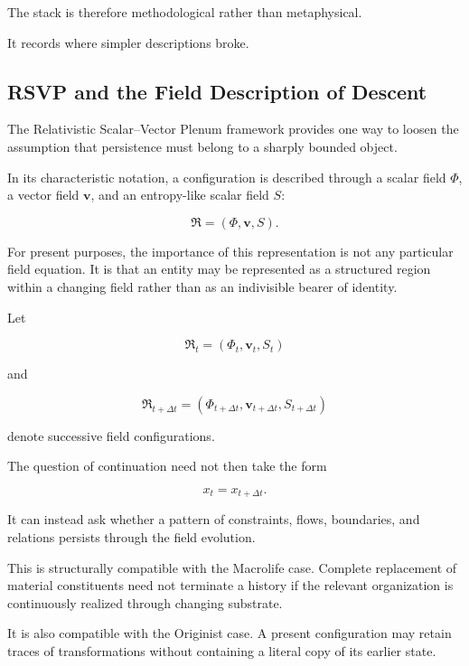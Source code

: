 \documentclass[
  11pt,
  a4paper,
  DIV=12,
  BCOR=0mm,
  parskip=half-
]{scrartcl}
\theoremstyle{definition}
\theoremstyle{plain}
\theoremstyle{remark}
\begin{document}
The stack is therefore methodological rather than metaphysical.

It records where simpler descriptions broke.


\subsection{RSVP and the Field Description of Descent}
\label{sec:rsvp-descent}

The Relativistic Scalar--Vector Plenum framework provides one way to loosen the
assumption that persistence must belong to a sharply bounded object.

In its characteristic notation, a configuration is described through a scalar
field \(\Phi\), a vector field \(\mathbf v\), and an entropy-like scalar field
\(S\):

\[
  \mathfrak R
  =
  (\Phi,\mathbf v,S).
\]

For present purposes, the importance of this representation is not any
particular field equation. It is that an entity may be represented as a
structured region within a changing field rather than as an indivisible bearer
of identity.

Let

\[
  \mathfrak R_t
  =
  (\Phi_t,\mathbf v_t,S_t)
\]

and

\[
  \mathfrak R_{t+\Delta t}
  =
  (\Phi_{t+\Delta t},
   \mathbf v_{t+\Delta t},
   S_{t+\Delta t})
\]

denote successive field configurations.

The question of continuation need not then take the form

\[
  x_t=x_{t+\Delta t}.
\]

It can instead ask whether a pattern of constraints, flows, boundaries, and
relations persists through the field evolution.

This is structurally compatible with the Macrolife case. Complete replacement
of material constituents need not terminate a history if the relevant
organization is continuously realized through changing substrate.

It is also compatible with the Originist case. A present configuration may
retain traces of transformations without containing a literal copy of its
earlier state.
\end{document}
